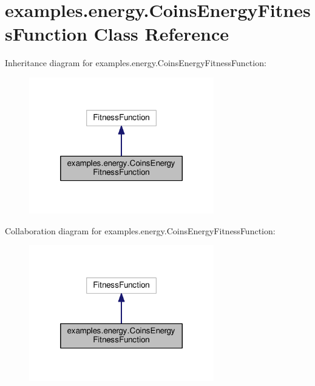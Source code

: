 \hypertarget{classexamples_1_1energy_1_1_coins_energy_fitness_function}{\section{examples.\-energy.\-Coins\-Energy\-Fitness\-Function Class Reference}
\label{classexamples_1_1energy_1_1_coins_energy_fitness_function}
}


Inheritance diagram for examples.\-energy.\-Coins\-Energy\-Fitness\-Function\-:
\nopagebreak
\begin{figure}[H]
\begin{center}
\leavevmode
\includegraphics[width=228pt]{classexamples_1_1energy_1_1_coins_energy_fitness_function__inherit__graph}
\end{center}
\end{figure}


Collaboration diagram for examples.\-energy.\-Coins\-Energy\-Fitness\-Function\-:
\nopagebreak
\begin{figure}[H]
\begin{center}
\leavevmode
\includegraphics[width=228pt]{classexamples_1_1energy_1_1_coins_energy_fitness_function__coll__graph}
\end{center}
\end{figure}
